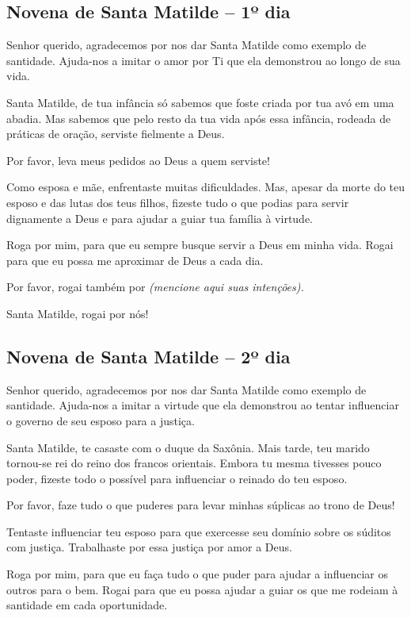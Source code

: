 \subsection{Novena de Santa Matilde – 1º dia}



Senhor querido, agradecemos por nos dar Santa Matilde como exemplo de santidade. Ajuda-nos a imitar o amor por Ti que ela demonstrou ao longo de sua vida.

Santa Matilde, de tua infância só sabemos que foste criada por tua avó em uma abadia. Mas sabemos que pelo resto da tua vida após essa infância, rodeada de práticas de oração, serviste fielmente a Deus.

Por favor, leva meus pedidos ao Deus a quem serviste!

Como esposa e mãe, enfrentaste muitas dificuldades. Mas, apesar da morte do teu esposo e das lutas dos teus filhos, fizeste tudo o que podias para servir dignamente a Deus e para ajudar a guiar tua família à virtude.

Roga por mim, para que eu sempre busque servir a Deus em minha vida. Rogai para que eu possa me aproximar de Deus a cada dia.

Por favor, rogai também por \textit{(mencione aqui suas intenções).}

Santa Matilde, rogai por nós!


\subsection{Novena de Santa Matilde – 2º dia}



Senhor querido, agradecemos por nos dar Santa Matilde como exemplo de santidade. Ajuda-nos a imitar a virtude que ela demonstrou ao tentar influenciar o governo de seu esposo para a justiça.

Santa Matilde, te casaste com o duque da Saxônia. Mais tarde, teu marido tornou-se rei do reino dos francos orientais. Embora tu mesma tivesses pouco poder, fizeste todo o possível para influenciar o reinado do teu esposo.

Por favor, faze tudo o que puderes para levar minhas súplicas ao trono de Deus!

Tentaste influenciar teu esposo para que exercesse seu domínio sobre os súditos com justiça. Trabalhaste por essa justiça por amor a Deus.

Roga por mim, para que eu faça tudo o que puder para ajudar a influenciar os outros para o bem. Rogai para que eu possa ajudar a guiar os que me rodeiam à santidade em cada oportunidade.

